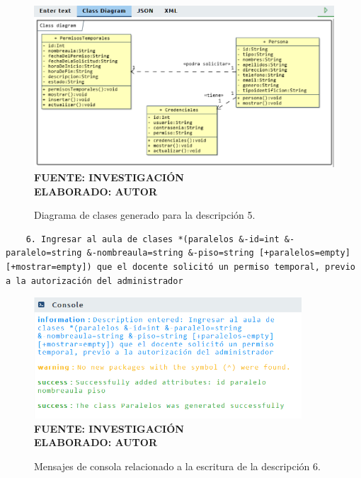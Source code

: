  \begin{figure}[H]
 	\centering
 	\caption{Diagrama de clases generado para la descripción 5.}
 	\includegraphics[width=15cm]{img/dc-eva-005.png}
 	\label{fig:dc_eva_005}
 	\vspace{4mm}
 	{\footnotesize \textbf{\\ FUENTE: INVESTIGACIÓN} \textbf{\\ ELABORADO: AUTOR}}
 \end{figure}
 
 \begin{lstlisting}
 	6. Ingresar al aula de clases *(paralelos &-id=int &-paralelo=string &-nombreaula=string &-piso=string [+paralelos=empty] [+mostrar=empty]) que el docente solicitó un permiso temporal, previo a la autorización del administrador \end{lstlisting}
 
    \begin{figure}[h!]
    	\centering
 	\caption{Mensajes de consola relacionado a la escritura de la descripción 6.}
 	\includegraphics[width=10cm]{img/not-eva-006.png}
 	\label{fig:not_eva_006}
 	\vspace{4mm}
 	{\footnotesize \textbf{\\ FUENTE: INVESTIGACIÓN} \textbf{\\ ELABORADO: AUTOR}}
 \end{figure}
 
